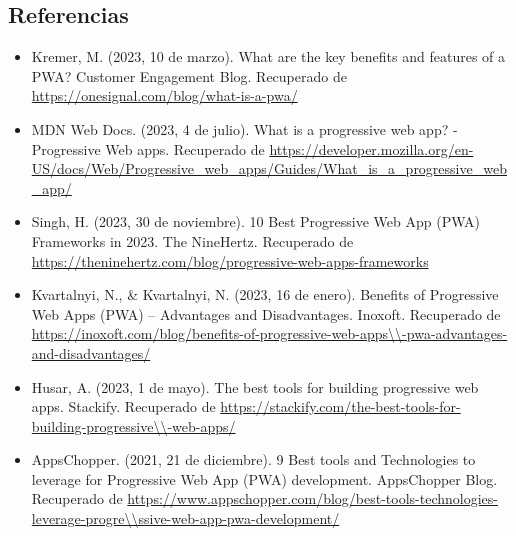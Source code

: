 \documentclass{article}
\begin{document}
\begin{multicols}{2}
	\section{Referencias}
	\begin{itemize}
		\item Kremer, M. (2023, 10 de marzo). What are the key benefits and features of a PWA? Customer Engagement Blog. Recuperado de \url{https://onesignal.com/blog/what-is-a-pwa/}
		\item MDN Web Docs. (2023, 4 de julio). What is a progressive web app? - Progressive Web apps. Recuperado de \url{https://developer.mozilla.org/en-US/docs/Web/Progressive_web_apps/Guides/What_is_a_progressive_web_app/}
		\item Singh, H. (2023, 30 de noviembre). 10 Best Progressive Web App (PWA) Frameworks in 2023. The NineHertz. Recuperado de \url{https://theninehertz.com/blog/progressive-web-apps-frameworks}
		\item Kvartalnyi, N., \& Kvartalnyi, N. (2023, 16 de enero). Benefits of Progressive Web Apps (PWA) – Advantages and Disadvantages. Inoxoft. Recuperado de \url{https://inoxoft.com/blog/benefits-of-progressive-web-apps\\-pwa-advantages-and-disadvantages/}
		\item Husar, A. (2023, 1 de mayo). The best tools for building progressive web apps. Stackify. Recuperado de \url{https://stackify.com/the-best-tools-for-building-progressive\\-web-apps/}
		\item AppsChopper. (2021, 21 de diciembre). 9 Best tools and Technologies to leverage for Progressive Web App (PWA) development. AppsChopper Blog. Recuperado de \url{https://www.appschopper.com/blog/best-tools-technologies-leverage-progre\\ssive-web-app-pwa-development/}
	\end{itemize}
	\end{multicols}
\end{document}
